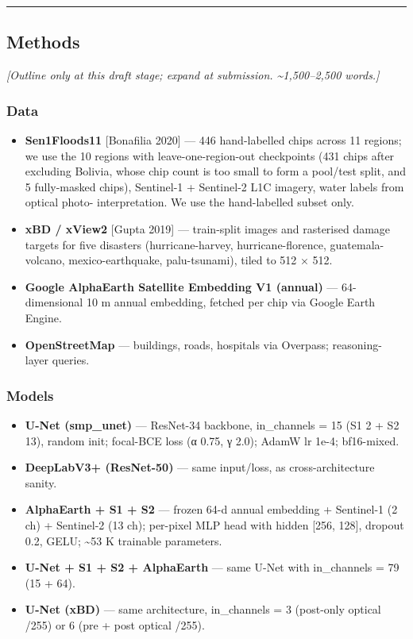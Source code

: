 \begin{center}\rule{0.5\linewidth}{0.5pt}\end{center}

\subsection{Methods}\label{methods}

\emph{{[}Outline only at this draft stage; expand at submission. \textasciitilde1,500--2,500 words.{]}}

\subsubsection{Data}\label{data}

\begin{itemize}
\tightlist
\item
  \textbf{Sen1Floods11} {[}Bonafilia 2020{]} --- 446 hand-labelled chips across 11
  regions; we use the 10 regions with leave-one-region-out checkpoints
  (431 chips after excluding Bolivia, whose chip count is too small to
  form a pool/test split, and 5 fully-masked chips),
  Sentinel-1 + Sentinel-2 L1C imagery, water labels from optical photo-
  interpretation. We use the hand-labelled subset only.
\item
  \textbf{xBD / xView2} {[}Gupta 2019{]} --- train-split images and rasterised damage
  targets for five disasters (hurricane-harvey, hurricane-florence,
  guatemala-volcano, mexico-earthquake, palu-tsunami), tiled to 512 × 512.
\item
  \textbf{Google AlphaEarth Satellite Embedding V1 (annual)} --- 64-dimensional
  10 m annual embedding, fetched per chip via Google Earth Engine.
\item
  \textbf{OpenStreetMap} --- buildings, roads, hospitals via Overpass; reasoning-
  layer queries.
\end{itemize}

\subsubsection{Models}\label{models}

\begin{itemize}
\tightlist
\item
  \textbf{U-Net (smp\_unet)} --- ResNet-34 backbone, in\_channels = 15 (S1 2 + S2 13),
  random init; focal-BCE loss (α 0.75, γ 2.0); AdamW lr 1e-4; bf16-mixed.
\item
  \textbf{DeepLabV3+ (ResNet-50)} --- same input/loss, as cross-architecture sanity.
\item
  \textbf{AlphaEarth + S1 + S2} --- frozen 64-d annual embedding + Sentinel-1 (2 ch) +
  Sentinel-2 (13 ch); per-pixel MLP head with hidden {[}256, 128{]}, dropout 0.2,
  GELU; \textasciitilde53 K trainable parameters.
\item
  \textbf{U-Net + S1 + S2 + AlphaEarth} --- same U-Net with in\_channels = 79 (15 + 64).
\item
  \textbf{U-Net (xBD)} --- same architecture, in\_channels = 3 (post-only optical /255)
  or 6 (pre + post optical /255).
\end{itemize}

